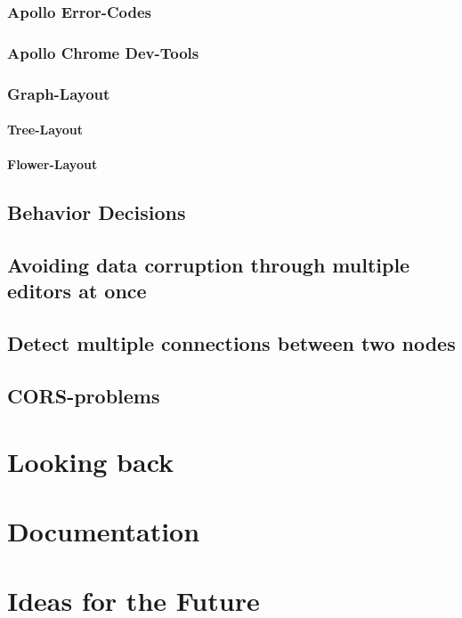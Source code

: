 \subsection{Apollo Error-Codes}
\subsection{Apollo Chrome Dev-Tools}
\subsection{Graph-Layout}
\subsubsection{Tree-Layout}
\subsubsection{Flower-Layout}
\section{Behavior Decisions}
\section{Avoiding data corruption through multiple editors at once}
\section{Detect multiple connections between two nodes}
\section{CORS-problems}

\chapter{Looking back}

\chapter{Documentation}

\chapter{Ideas for the Future}
